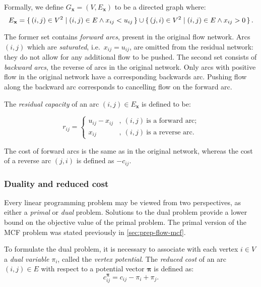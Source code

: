 Formally, we define $G_{\mathbf{x}}=\left(V,E_{\mathbf{x}}\right)$ to be a directed graph where:
\begin{equation}
E_{\mathbf{x}}=\set{(i,j)\in V^{2} | (i,j)\in E\land x_{ij}<u_{ij}} \cup \set{(j,i)\in V^{2} | (i,j)\in E\land x_{ij}>0}. 
\end{equation}

The former set contains \emph{forward arcs}, present in the original flow network. Arcs $(i,j)$ which are \emph{saturated}, i.e.\ $x_{ij}=u_{ij}$, are omitted from the residual network: they do not allow for any additional flow to be pushed. The second set consists of \emph{backward arcs}, the reverse of arcs in the original network. Only arcs with positive flow in the original network have a corresponding backwards arc. Pushing flow along the backward arc corresponds to cancelling flow on the forward arc.

The \emph{residual capacity} of an arc $(i,j)\in E_{\mathbf{x}}$ is defined to be:

\begin{equation}
r_{ij}=\begin{cases}
u_{ij}-x_{ij} & ,\:(i,j)\:\mbox{is a forward arc;}\\
x_{ij} & ,\:(i,j)\:\mbox{is a reverse arc.}
\end{cases}
\end{equation}

The cost of forward arcs is the same as in the original network, whereas the cost of a reverse arc $(j,i)$ is defined as $-c_{ij}$.

\subsubsection{Duality and reduced cost} \label{sec:prep-flow-rc-and-dual}


Every linear programming problem may be viewed from two perspectives, as either a \emph{primal} or \emph{dual} problem. Solutions to the dual problem provide a lower bound on the objective value of the primal problem. The primal version of the MCF problem was stated previously in \cref{sec:prep-flow-mcf}. 

To formulate the dual problem, it is necessary to associate with each vertex $i \in V$ a \emph{dual variable} $\pi_i$, called the \emph{vertex potential}. The \emph{reduced cost} of an arc $(i,j)\in E$ with respect to a potential vector $\boldsymbol{\pi}$ is defined as:
\begin{equation} \label{eq:reduced-costs}
c_{ij}^{\boldsymbol{\pi}}=c_{ij}-\pi_{i}+\pi_{j}.
\end{equation}


